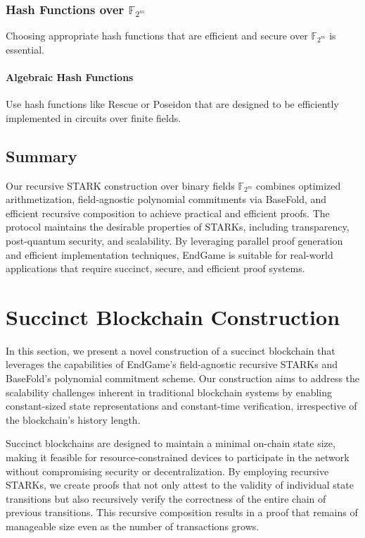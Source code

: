 \documentclass{article}
\theoremstyle{plain}
\theoremstyle{definition}
\theoremstyle{remark}
\theoremstyle{problem}
\begin{document}
\subsubsection{Hash Functions over $\mathbb{F}_{2^m}$}

Choosing appropriate hash functions that are efficient and secure over $\mathbb{F}_{2^m}$ is essential.

\paragraph{Algebraic Hash Functions}

Use hash functions like Rescue or Poseidon that are designed to be efficiently implemented in circuits over finite fields.

\subsection{Summary}

Our recursive STARK construction over binary fields $\mathbb{F}_{2^m}$ combines optimized arithmetization, field-agnostic polynomial commitments via BaseFold, and efficient recursive composition to achieve practical and efficient proofs. The protocol maintains the desirable properties of STARKs, including transparency, post-quantum security, and scalability. By leveraging parallel proof generation and efficient implementation techniques, EndGame is suitable for real-world applications that require succinct, secure, and efficient proof systems.


\section{Succinct Blockchain Construction}

In this section, we present a novel construction of a succinct blockchain that leverages the capabilities of EndGame's field-agnostic recursive STARKs and BaseFold's polynomial commitment scheme. Our construction aims to address the scalability challenges inherent in traditional blockchain systems by enabling constant-sized state representations and constant-time verification, irrespective of the blockchain's history length.

Succinct blockchains are designed to maintain a minimal on-chain state size, making it feasible for resource-constrained devices to participate in the network without compromising security or decentralization. By employing recursive STARKs, we create proofs that not only attest to the validity of individual state transitions but also recursively verify the correctness of the entire chain of previous transitions. This recursive composition results in a proof that remains of manageable size even as the number of transactions grows.
\end{document}

